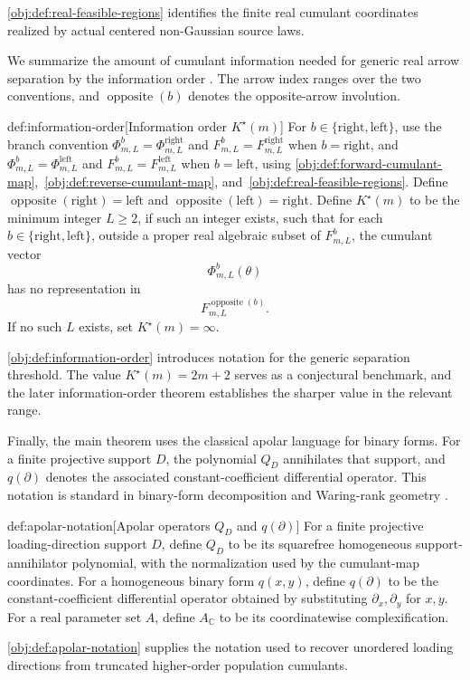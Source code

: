 \cref{obj:def:real-feasible-regions} identifies the finite real cumulant coordinates realized by actual centered non-Gaussian source laws.

We summarize the amount of cumulant information needed for generic real arrow separation by the information order . The arrow index  ranges over the two conventions, and \(\operatorname{opposite}(b)\) denotes the opposite-arrow involution.

\begin{definitionv}{def:information-order}[Information order \(K^\star(m)\)]
For \(b\in\{\mathrm{right},\mathrm{left}\}\), use the branch convention \(\Phi^b_{m,L}=\Phi^{\mathrm{right}}_{m,L}\) and \(F^b_{m,L}=F^{\mathrm{right}}_{m,L}\) when \(b=\mathrm{right}\), and \(\Phi^b_{m,L}=\Phi^{\mathrm{left}}_{m,L}\) and \(F^b_{m,L}=F^{\mathrm{left}}_{m,L}\) when \(b=\mathrm{left}\), using \cref{obj:def:forward-cumulant-map},~\cref{obj:def:reverse-cumulant-map}, and~\cref{obj:def:real-feasible-regions}. Define \(\operatorname{opposite}(\mathrm{right})=\mathrm{left}\) and \(\operatorname{opposite}(\mathrm{left})=\mathrm{right}\). Define \(K^\star(m)\) to be the minimum integer \(L\geq 2\), if such an integer exists, such that for each \(b\in\{\mathrm{right},\mathrm{left}\}\), outside a proper real algebraic subset of \(F^b_{m,L}\), the cumulant vector
\[
\Phi^b_{m,L}(\theta)
\]
has no representation in
\[
F^{\operatorname{opposite}(b)}_{m,L}.
\]
If no such \(L\) exists, set \(K^\star(m)=\infty\).
\end{definitionv}

\cref{obj:def:information-order} introduces notation for the generic separation threshold. The value \(K^\star(m)=2m+2\) serves as a conjectural benchmark, and the later information-order theorem establishes the sharper value in the relevant range.

Finally, the main theorem uses the classical apolar language for binary forms. For a finite projective support \(D\), the polynomial \(Q_D\) annihilates that support, and \(q(\partial)\) denotes the associated constant-coefficient differential operator. This notation is standard in binary-form decomposition and Waring-rank geometry \citep{ComonMourrain1996,Landsberg2012}.

\begin{definitionv}{def:apolar-notation}[Apolar operators \(Q_D\) and \(q(\partial)\)]
For a finite projective loading-direction support \(D\), define \(Q_D\) to be its squarefree homogeneous support-annihilator polynomial, with the normalization used by the cumulant-map coordinates. For a homogeneous binary form \(q(x,y)\), define \(q(\partial)\) to be the constant-coefficient differential operator obtained by substituting \(\partial_x,\partial_y\) for \(x,y\). For a real parameter set \(A\), define \(A_{\mathbb C}\) to be its coordinatewise complexification.
\end{definitionv}

\cref{obj:def:apolar-notation} supplies the notation used to recover unordered loading directions from truncated higher-order population cumulants.
